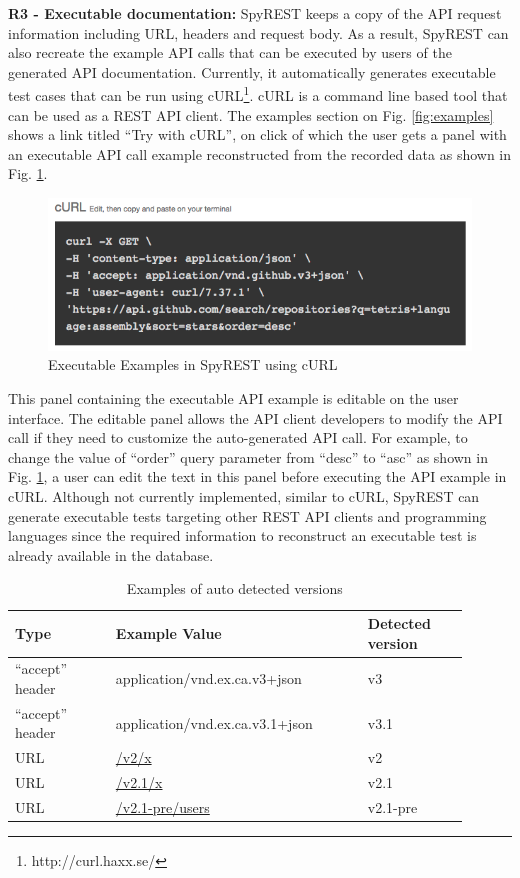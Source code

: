 \documentclass[conference]{IEEEtran}
\begin{document}
\textbf{R3 -  Executable documentation:} SpyREST keeps a copy of the API request information including URL, headers and request body. As a result, SpyREST can also recreate the example API calls that can be executed by users of the generated API documentation. Currently, it automatically generates executable test cases that can be run using cURL\footnote{http://curl.haxx.se/}. cURL is a command line based tool that can be used as a REST API client. The examples section on Fig. \ref{fig:examples} shows a link titled ``Try with cURL'', on click of which the user gets a panel with an executable API call example reconstructed from the recorded data as shown in Fig. \ref{fig:curl}.

\begin{figure}[!tbh]
  \centering
  \includegraphics[width=\linewidth]{curl.png}
  \caption{Executable Examples in SpyREST using cURL}
  \label{fig:curl}
\end{figure}

This panel containing the executable API example is editable on the user interface. The editable panel allows the API client developers to modify the API call if they need to customize the auto-generated API call. For example, to change the value of ``order'' query parameter from ``desc'' to ``asc''  as shown in Fig. \ref{fig:curl}, a user can edit the text in this panel before executing the API example in cURL. Although not currently implemented, similar to cURL, SpyREST can generate executable tests targeting other REST API clients and programming languages since the required information to reconstruct an executable test is already available in the database.

\begin{table}[!tbh]
  \caption{Examples of auto detected versions}
  \begin{tabular}{|p{0.2\linewidth}|p{0.5\linewidth}|p{0.2\linewidth}|}
    \hline
    Type & Example Value & Detected version\\
    \hline
    ``accept'' header & application/vnd.ex.ca.v3+json & v3\\
    \hline
    ``accept'' header & application/vnd.ex.ca.v3.1+json & v3.1\\
    \hline
    URL & \url{/v2/x} & v2\\
    \hline
    URL & \url{/v2.1/x} & v2.1\\
    \hline
    URL & \url{/v2.1-pre/users} & v2.1-pre\\
    \hline
  \end{tabular}
  \label{table:versions}
\end{table}
\end{document}
